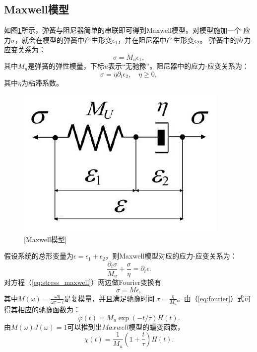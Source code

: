 \subsection{Maxwell模型}
\vspace{0.2cm}
如图\ref{fig:maxwell_model}所示，弹簧与阻尼器简单的串联即可得到Maxwell模型。对模型施加一个
应力$\sigma$，就会在模型的弹簧中产生形变$\epsilon_1$，并在阻尼器中产生形变$\epsilon_2$。
弹簧中的应力-应变关系为：
\begin{equation}
	\sigma=M_u\epsilon_1,
\end{equation}
其中$M_u$是弹簧的弹性模量，下标$u$表示“无驰豫”。阻尼器中的应力-应变关系为：
\begin{equation}
	\sigma=\eta\partial_t \epsilon_2, \quad \eta\geq0,
\end{equation}
其中$\eta$为粘滞系数。
\begin{figure}[!htbp]
	    \centering
		\includegraphics[width=0.6\linewidth]{figure/maxwell_model}
	    [Maxwell模型]
		\label{fig:maxwell_model}
\end{figure}
假设系统的总形变量为$\epsilon=\epsilon_1+\epsilon_2$，则Maxwell模型对应的应力-应变关系为：
\begin{equation}
	\frac{\partial_t\sigma}{M_u}+\frac{\sigma}{\eta}=\partial_t\epsilon.
	\label{eq:stress_maxwell}
\end{equation}
对方程（\ref{eq:stress_maxwell}）两边做Fourier变换有
\begin{equation}
	\sigma=M\epsilon,
\end{equation}
其中$M(\omega)=\frac{\omega\eta}{\omega\tau-i}$是复模量，并且满足驰豫时间
$\tau=\frac{\eta}{M_u}$。由（\ref{eq:fourier}）式可得其相应的驰豫函数为：
\begin{equation}
	\varphi(t)=M_u\exp(-t/\tau)H(t).
\end{equation}
由$M(\omega)J(\omega)=1$可以推到出$Maxwell$模型的蠕变函数，
\begin{equation}
	\chi(t)=\frac{1}{M_u}(1+\frac{t}{\tau})H(t).
\end{equation}
